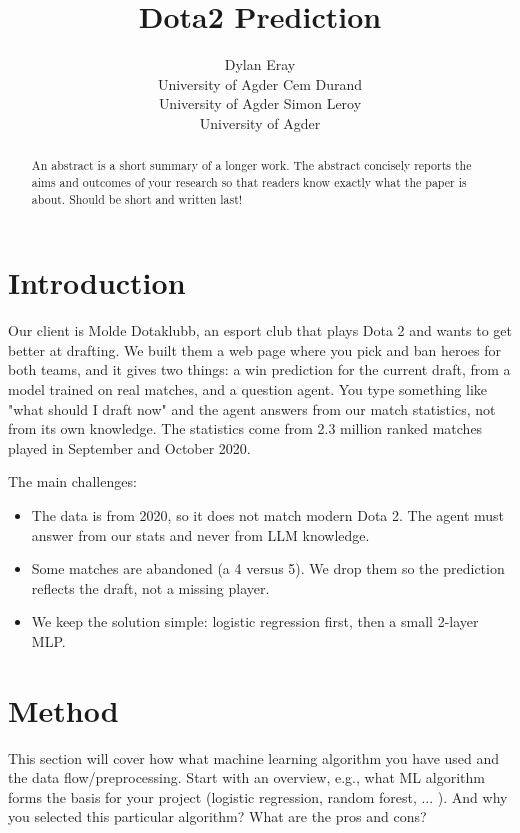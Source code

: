 \documentclass{article}
\title{Dota2 Prediction}
\author{
  Dylan Eray \\
  University of Agder
  \And
  Cem Durand \\
  University of Agder
  \And
  Simon Leroy \\
  University of Agder
}
\begin{document}
\maketitle

\begin{abstract}
An abstract is a short summary of a longer work. The abstract concisely reports the aims and outcomes of your research so that readers know exactly what the paper is about. Should be short and written last!
\end{abstract}




\section{Introduction}
Our client is Molde Dotaklubb, an esport club that plays Dota 2 and wants to get better at drafting. We built them a web page where you pick and ban heroes for both teams, and it gives two things: a win prediction for the current draft, from a model trained on real matches, and a question agent. You type something like "what should I draft now" and the agent answers from our match statistics, not from its own knowledge. The statistics come from 2.3 million ranked matches played in September and October 2020.

The main challenges:
\begin{itemize}
    \item The data is from 2020, so it does not match modern Dota 2. The agent must answer from our stats and never from LLM knowledge.
    \item Some matches are abandoned (a 4 versus 5). We drop them so the prediction reflects the draft, not a missing player.
    \item We keep the solution simple: logistic regression first, then a small 2-layer MLP.
\end{itemize}

\section{Method}
This section will cover how what machine learning algorithm you have used and the data flow/preprocessing.
Start with an overview, e.g., what ML algorithm forms the basis for your project (logistic regression, random forest, ... ). And why you selected this particular algorithm? What are the pros and cons?
\end{document}
